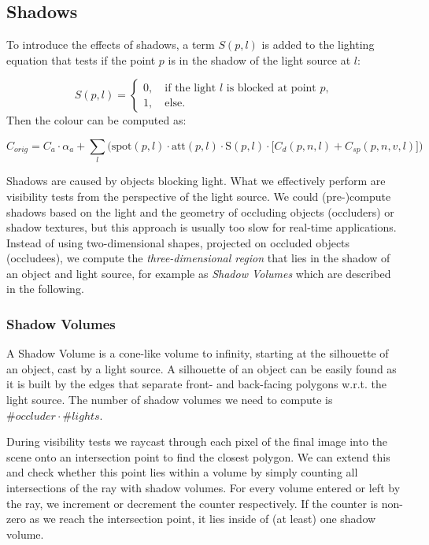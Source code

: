 \documentclass{panikzettel}
\begin{document}
\subsection{Shadows}

To introduce the effects of shadows, a term $S(p,l)$ is added to the lighting equation that tests if the point $p$ is in the shadow of the light source at $l$:

  $$ S(p,l) =\begin{cases}
    0, \quad \text{if the light } l \text{ is blocked at point } p, \\
    1, \quad \text{else}.
    \end{cases}$$
Then the colour can be computed as:

$$ C_{orig} =  C_a \cdot \alpha_a + \sum_l \bigg(\text{spot}(p,l) \cdot \text{att}(p,l) \cdot \text{S}(p,l) \cdot \big[C_d(p,n,l) + C_{sp}(p,n,v,l)\big]\bigg)
$$

Shadows are caused by objects blocking light. What we effectively perform are visibility tests from the perspective of the light source. We could (pre-)compute shadows based on the light and the geometry of occluding objects (occluders) or shadow textures, but this approach is usually too slow for real-time applications. Instead of using two-dimensional shapes, projected on occluded objects (occludees), we compute the \emph{three-dimensional region} that lies in the shadow of an object and light source, for example as \emph{Shadow Volumes} which are described in the following.

\subsubsection*{Shadow Volumes}

A Shadow Volume is a cone-like volume to infinity, starting at the silhouette of an object, cast by a light source. A silhouette of an object can be easily found as it is built by the edges that separate front- and back-facing polygons w.r.t. the light source. The number of shadow volumes we need to compute is $\# occluder \cdot \# lights$.

During visibility tests we raycast through each pixel of the final image into the scene onto an intersection point to find the closest polygon. We can extend this and check whether this point lies within a volume by simply counting all intersections of the ray with shadow volumes. For every volume entered or left by the ray, we increment or decrement the counter respectively. If the counter is non-zero as we reach the intersection point, it lies inside of (at least) one shadow volume.
\end{document}
